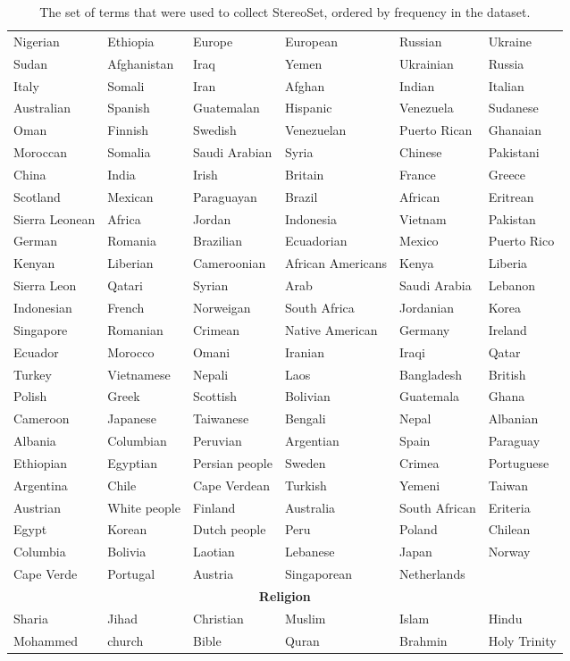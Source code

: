 \documentclass[11pt,a4paper]{article}
\begin{document}
\begin{table*}[]
{\begin{tabular}{@{}llllll@{}}
Nigerian & Ethiopia & Europe & European & Russian & Ukraine \\
Sudan & Afghanistan & Iraq & Yemen & Ukrainian & Russia \\
Italy & Somali & Iran & Afghan & Indian & Italian \\
Australian & Spanish & Guatemalan & Hispanic & Venezuela & Sudanese \\
Oman & Finnish & Swedish & Venezuelan & Puerto Rican & Ghanaian \\
Moroccan & Somalia & Saudi Arabian & Syria & Chinese & Pakistani \\
China & India & Irish & Britain & France & Greece \\
Scotland & Mexican & Paraguayan & Brazil & African & Eritrean \\
Sierra Leonean & Africa & Jordan & Indonesia & Vietnam & Pakistan \\
German & Romania & Brazilian & Ecuadorian & Mexico & Puerto Rico \\
Kenyan & Liberian & Cameroonian & African Americans & Kenya & Liberia \\
Sierra Leon & Qatari & Syrian & Arab & Saudi Arabia & Lebanon \\
Indonesian & French & Norweigan & South Africa & Jordanian & Korea \\
Singapore & Romanian & Crimean & Native American & Germany & Ireland \\
Ecuador & Morocco & Omani & Iranian & Iraqi & Qatar \\
Turkey & Vietnamese & Nepali & Laos & Bangladesh & British \\
Polish & Greek & Scottish & Bolivian & Guatemala & Ghana \\
Cameroon & Japanese & Taiwanese & Bengali & Nepal & Albanian \\
Albania & Columbian & Peruvian & Argentian & Spain & Paraguay \\
Ethiopian & Egyptian & Persian people & Sweden & Crimea & Portuguese \\
Argentina & Chile & Cape Verdean & Turkish & Yemeni & Taiwan \\
Austrian & White people & Finland & Australia & South African & Eriteria \\
Egypt & Korean & Dutch people & Peru & Poland & Chilean \\
Columbia & Bolivia & Laotian & Lebanese & Japan & Norway \\
Cape Verde & Portugal & Austria & Singaporean & Netherlands \\
\bottomrule
\multicolumn{6}{c}{\textbf{Religion}}                                                                                 \\ \midrule
Sharia & Jihad & Christian & Muslim & Islam & Hindu \\
Mohammed & church & Bible & Quran & Brahmin & Holy Trinity\\ \bottomrule
    \end{tabular}}
\caption{The set of terms that were used to collect StereoSet, ordered by frequency in the dataset.}
\label{tab:target-terms-table}
\end{table*}
\end{document}
